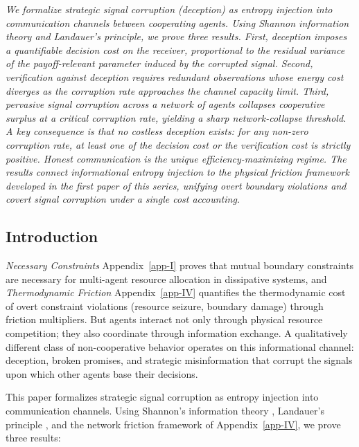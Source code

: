\documentclass[11pt]{article}
\theoremstyle{plain}
\theoremstyle{definition}
\theoremstyle{remark}
\let\origsubsection\subsection
\renewcommand{\subsection}{\needspace{7\baselineskip}\origsubsection}
\begin{document}
\emph{We formalize strategic signal corruption (deception) as entropy
injection into communication channels between cooperating agents. Using
Shannon information theory and Landauer's principle, we prove three
results. First, deception imposes a quantifiable decision cost on the
receiver, proportional to the residual variance of the payoff-relevant
parameter induced by the corrupted signal. Second, verification against
deception requires redundant observations whose energy cost diverges as
the corruption rate approaches the channel capacity limit. Third,
pervasive signal corruption across a network of agents collapses
cooperative surplus at a critical corruption rate, yielding a sharp
network-collapse threshold. A key consequence is that no costless
deception exists: for any non-zero corruption rate, at least one of the
decision cost or the verification cost is strictly positive. Honest
communication is the unique efficiency-maximizing regime. The results
connect informational entropy injection to the physical friction
framework developed in the first paper of this series, unifying overt
boundary violations and covert signal corruption under a single cost
accounting.}

\subsection{Introduction}\label{introduction-2}

\emph{Necessary Constraints} Appendix~\ref{app-I} proves that mutual
boundary constraints are necessary for multi-agent resource allocation
in dissipative systems, and \emph{Thermodynamic Friction}
Appendix~\ref{app-IV} quantifies the thermodynamic cost of overt
constraint violations (resource seizure, boundary damage) through
friction multipliers. But agents interact not only through physical
resource competition; they also coordinate through information exchange.
A qualitatively different class of non-cooperative behavior operates on
this informational channel: deception, broken promises, and strategic
misinformation that corrupt the signals upon which other agents base
their decisions.

This paper formalizes strategic signal corruption as entropy injection
into communication channels. Using Shannon's information theory
\citep{Shannon1948}, Landauer's principle \citep{Landauer1961}, and the
network friction framework of Appendix~\ref{app-IV}, we prove three
results:
\end{document}
